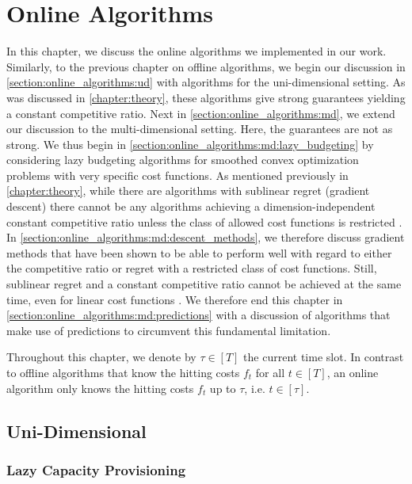 
\chapter{Online Algorithms}\label{chapter:online_algorithms}

In this chapter, we discuss the online algorithms we implemented in our work. Similarly, to the previous chapter on offline algorithms, we begin our discussion in \autoref{section:online_algorithms:ud} with algorithms for the uni-dimensional setting. As was discussed in \autoref{chapter:theory}, these algorithms give strong guarantees yielding a constant competitive ratio. Next in \autoref{section:online_algorithms:md}, we extend our discussion to the multi-dimensional setting. Here, the guarantees are not as strong. We thus begin in \autoref{section:online_algorithms:md:lazy_budgeting} by considering lazy budgeting algorithms for smoothed convex optimization problems with very specific cost functions. As mentioned previously in \autoref{chapter:theory}, while there are algorithms with sublinear regret (gradient descent) there cannot be any algorithms achieving a dimension-independent constant competitive ratio unless the class of allowed cost functions is restricted \cite{Chen2018}. In \autoref{section:online_algorithms:md:descent_methods}, we therefore discuss gradient methods that have been shown to be able to perform well with regard to either the competitive ratio or regret with a restricted class of cost functions. Still, sublinear regret and a constant competitive ratio cannot be achieved at the same time, even for linear cost functions \cite{Andrew2015}. We therefore end this chapter in \autoref{section:online_algorithms:md:predictions} with a discussion of algorithms that make use of predictions to circumvent this fundamental limitation.

Throughout this chapter, we denote by $\tau \in [T]$ the current time slot. In contrast to offline algorithms that know the hitting costs $f_t$ for all $t \in [T]$, an online algorithm only knows the hitting costs $f_t$ up to $\tau$, i.e. $t \in [\tau]$.

\section{Uni-Dimensional}\label{section:online_algorithms:ud}

\subsection{Lazy Capacity Provisioning}\label{section:online_algorithms:ud:lazy_capacity_provisioning}

